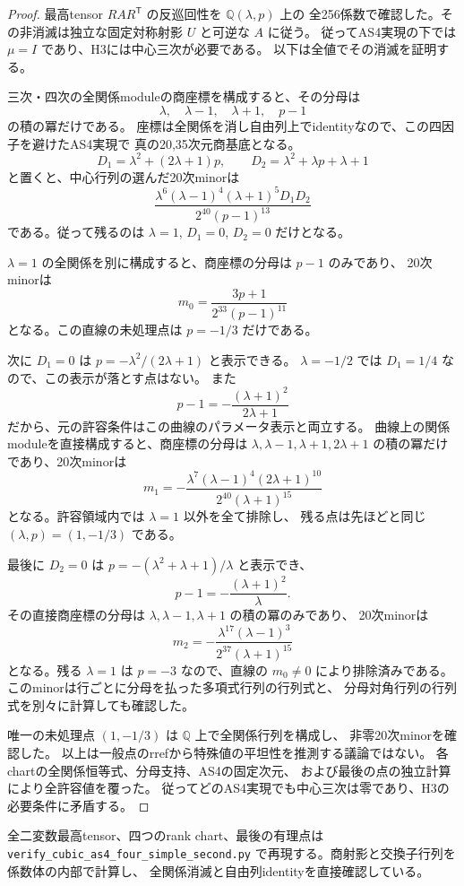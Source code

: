 \begin{proof}
最高tensor $R A R^{\mathsf T}$ の反巡回性を $\mathbb Q(\lambda,p)$ 上の
全256係数で確認した。その非消滅は独立な固定対称射影 $U$ と可逆な $A$ に従う。
従ってAS4実現の下では $\mu=I$ であり、H3には中心三次が必要である。
以下は全値でその消滅を証明する。

三次・四次の全関係moduleの商座標を構成すると、その分母は
\[
 \lambda,\quad\lambda-1,\quad\lambda+1,\quad p-1
\]
の積の冪だけである。
座標は全関係を消し自由列上でidentityなので、この四因子を避けたAS4実現で
真の20,35次元商基底となる。
\[
 D_1=\lambda^2+(2\lambda+1)p,\qquad
 D_2=\lambda^2+\lambda p+\lambda+1
\]
と置くと、中心行列の選んだ20次minorは
\[
 \frac{\lambda^6(\lambda-1)^4(\lambda+1)^5D_1D_2}
 {2^{40}(p-1)^{13}}
\]
である。従って残るのは $\lambda=1$, $D_1=0$, $D_2=0$ だけとなる。

$\lambda=1$ の全関係を別に構成すると、商座標の分母は $p-1$ のみであり、
20次minorは
\[
 m_0=\frac{3p+1}{2^{33}(p-1)^{11}}
\]
となる。この直線の未処理点は $p=-1/3$ だけである。

次に $D_1=0$ は
$p=-\lambda^2/(2\lambda+1)$ と表示できる。
$\lambda=-1/2$ では $D_1=1/4$ なので、この表示が落とす点はない。
また
\[
 p-1=-\frac{(\lambda+1)^2}{2\lambda+1}
\]
だから、元の許容条件はこの曲線のパラメータ表示と両立する。
曲線上の関係moduleを直接構成すると、商座標の分母は
$\lambda,\lambda-1,\lambda+1,2\lambda+1$ の積の冪だけであり、20次minorは
\[
 m_1=-\frac{\lambda^7(\lambda-1)^4(2\lambda+1)^{10}}
 {2^{40}(\lambda+1)^{15}}
\]
となる。許容領域内では $\lambda=1$ 以外を全て排除し、
残る点は先ほどと同じ $(\lambda,p)=(1,-1/3)$ である。

最後に $D_2=0$ は
$p=-(\lambda^2+\lambda+1)/\lambda$ と表示でき、
\[
 p-1=-\frac{(\lambda+1)^2}{\lambda}.
\]
その直接商座標の分母は $\lambda,\lambda-1,\lambda+1$ の積の冪のみであり、
20次minorは
\[
 m_2=-\frac{\lambda^{17}(\lambda-1)^3}{2^{37}(\lambda+1)^{15}}
\]
となる。残る $\lambda=1$ は $p=-3$ なので、直線の $m_0\ne0$ により排除済みである。
このminorは行ごとに分母を払った多項式行列の行列式と、
分母対角行列の行列式を別々に計算しても確認した。

唯一の未処理点 $(1,-1/3)$ は $\mathbb Q$ 上で全関係行列を構成し、
非零20次minorを確認した。
以上は一般点のrrefから特殊値の平坦性を推測する議論ではない。
各chartの全関係恒等式、分母支持、AS4の固定次元、
および最後の点の独立計算により全許容値を覆った。
従ってどのAS4実現でも中心三次は零であり、H3の必要条件に矛盾する。
\end{proof}

全二変数最高tensor、四つのrank chart、最後の有理点は
\texttt{verify\_\allowbreak{}cubic\_\allowbreak{}as4\_\allowbreak{}four\_\allowbreak{}simple\_\allowbreak{}second.py}
で再現する。商射影と交換子行列を係数体の内部で計算し、
全関係消滅と自由列identityを直接確認している。
